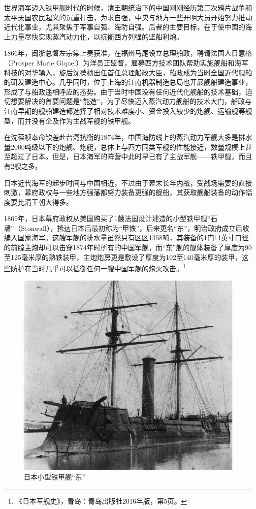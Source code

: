 \documentclass[12pt,UTF8]{ctexbook}
\begin{document}
世界海军迈入铁甲舰时代的时候，清王朝统治下的中国刚刚经历第二次鸦片战争和太平天国农民起义的沉重打击，为求自强，中央与地方一些开明大员开始努力推动近代化事业，尤其聚焦于军事自强、海防自强。后者的主要目标，在于使中国的海上力量尽快实现蒸汽动力化，以抗衡西方列强的坚船利炮。

1866年，闽浙总督左宗棠上奏获准，在福州马尾设立总理船政，聘请法国人日意格（Prosper Marie Giquel）为洋员正监督，雇募西方技术团队帮助实施舰船和海军科技的对华输入，旋后沈葆桢出任首任总理船政大臣，船政成为当时全国近代舰船的研发建造中心。几乎同时，位于上海的江南机器制造总局也开展舰船建造事业，形成了与船政遥相呼应的态势。由于当时中国没有任何近代化舰船的技术基础，迫切想要解决的首要问题是“能造”，为了尽快迈入蒸汽动力舰船的技术大门，船政与江南早期的舰船建造都选择了相对技术难度小、资金投入较少的炮舰、运输舰等舰型，而并没有企及作为主战军舰的铁甲舰。

在沈葆桢奉命钦差赴台湾抗衡的1874年，中国海防线上的蒸汽动力军舰大多是排水量2000吨级以下的炮舰、炮艇，总体上与西方同类军舰的性能接近，数量规模上甚至超过了日本。但是，日本海军的阵营中此时早已有了主战军舰——铁甲舰，而且有2艘之多。

日本近代海军的起步时间与中国相近，不过由于幕末长年内战，受战场需要的直接刺激，幕府政权与一些地方强藩都努力装备更强的舰船，其获取舰船装备的动作幅度要比清王朝大得多。

1869年，日本幕府政权从美国购买了1艘法国设计建造的小型铁甲舰“石墙”（Stonwall），抵达日本后最初称为“甲铁”，后来更名“东”，明治政府成立后收编入国家海军。这艘军舰的排水量虽然只有区区1358吨，其装备的1门11英寸口径的前膛主炮却可以击穿1874年时所有的中国军舰，而“东”舰的舰体装备了厚度为90至125毫米厚的熟铁装甲，主炮炮房更是敷设了厚度为102至140毫米厚的装甲，这些防护在当时几乎可以抵御任何一艘中国军舰的炮火攻击。\footnote{《日本军舰史》，青岛：青岛出版社2016年版，第5页。}

\begin{figure}[htbp]
	\centering
	\includegraphics[width=1\linewidth]{Images/42}
	\caption{日本小型铁甲舰“东”}
	\label{fig:1}
\end{figure}
\end{document}
